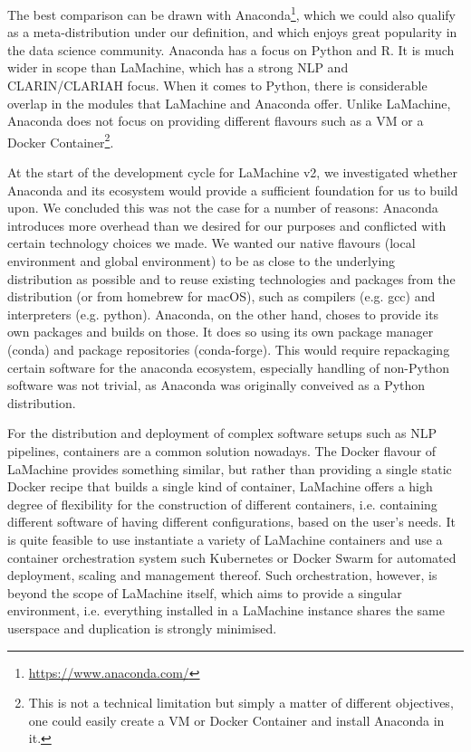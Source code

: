 \documentclass[a4paper,11pt]{article}
\begin{document}
The best comparison can be drawn with Anaconda\footnote{\url{https://www.anaconda.com/}}, which we could also qualify as
a meta-distribution under our definition, and which enjoys great popularity in the data science community. Anaconda has
a focus on Python and R. It is much wider in scope than LaMachine, which has a strong NLP and CLARIN/CLARIAH focus. When
it comes to Python, there is considerable overlap in the modules that LaMachine and Anaconda offer. Unlike LaMachine,
Anaconda does not focus on providing different flavours such as a VM or a Docker Container\footnote{This is not a
technical limitation but simply a matter of different objectives, one could easily create a VM or Docker Container and
install Anaconda in it.}.

At the start of the development cycle for LaMachine v2, we investigated whether Anaconda and its ecosystem would provide
a sufficient foundation for us to build upon. We concluded this was not the case for a number of reasons: Anaconda
introduces more overhead than we desired for our purposes and conflicted with certain technology choices we made. We
wanted our native flavours (local environment and global environment) to be as close to the underlying distribution as possible and to reuse existing
technologies and packages from the distribution (or from homebrew for macOS), such as compilers (e.g. gcc) and
interpreters (e.g. python).  Anaconda, on the other hand, choses to provide its own packages and builds on those. It
does so using its own package manager (conda) and package repositories (conda-forge). This would require repackaging certain software for the
anaconda ecosystem, especially handling of non-Python software was not trivial, as Anaconda was originally conveived as a
Python distribution.

For the distribution and deployment of complex software setups such as NLP pipelines, containers are a common solution
nowadays. The Docker flavour of LaMachine provides something similar, but rather than providing a single static Docker recipe
that builds a single kind of container, LaMachine offers a high degree of flexibility for the construction of different
containers, i.e. containing different software of having different configurations, based on the user's needs. It is
quite feasible to use instantiate a variety of LaMachine containers and use a container orchestration system such
Kubernetes or Docker Swarm for automated deployment, scaling and management thereof. Such orchestration, however, is
beyond the scope of LaMachine itself, which aims to provide a singular environment, i.e. everything installed in a
LaMachine instance shares the same userspace and duplication is strongly minimised.
\end{document}
